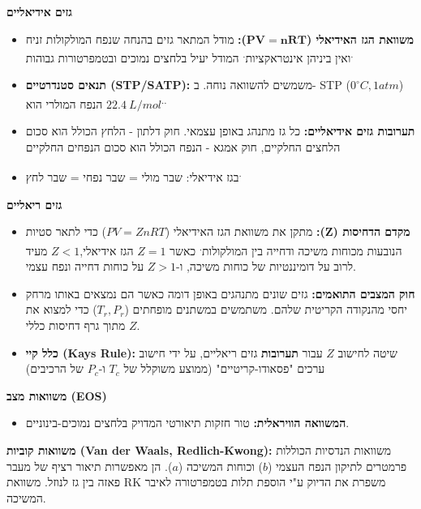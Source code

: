 \documentclass[
  hebrew,
  letterpaper,
  DIV=11,
  numbers=noendperiod]{scrreprt}
\providecommand{\tightlist}{%
  \setlength{\itemsep}{0pt}\setlength{\parskip}{0pt}}
\begin{document}
\textbf{גזים אידיאליים}

\begin{itemize}
\item
  \textbf{משוואת הגז האידיאלי (}\(\mathbf{PV = nRT}\)\textbf{):} מודל
  המתאר גזים בהנחה שנפח המולקולות זניח ואין ביניהן
  אינטראקציות\textsuperscript{.} המודל יעיל בלחצים נמוכים ובטמפרטורות
  גבוהות\textsuperscript{.}
\item
  \textbf{תנאים סטנדרטיים (STP/SATP):} משמשים להשוואה נוחה. ב- STP
  (\(0^{\circ}C,1atm\)) הנפח המולרי הוא
  \(22.4\ L\text{/}mol\)\textsuperscript{..}
\item
  \textbf{תערובות גזים אידיאליים:} כל גז מתנהג באופן עצמאי. חוק דלתון -
  הלחץ הכולל הוא סכום הלחצים החלקיים, חוק אמגא - הנפח הכולל הוא סכום
  הנפחים החלקיים
\item
  בגז אידיאלי: שבר מולי = שבר נפחי = שבר לחץ\textsuperscript{.}
\end{itemize}

\textbf{גזים ריאליים}

\begin{itemize}
\item
  \textbf{מקדם הדחיסות (}\(\mathbf{Z}\)\textbf{):} מתקן את משוואת הגז
  האידיאלי (\(PV = ZnRT\)) כדי לתאר סטיות הנובעות מכוחות משיכה ודחייה
  בין המולקולות\textsuperscript{.} כאשר \(Z = 1\) הגז אידיאלי,\(Z < 1\)
  מעיד לרוב על דומיננטיות של כוחות משיכה, ו-\(Z > 1\) על כוחות דחייה
  ונפח עצמי.
\item
  \textbf{חוק המצבים התואמים:} גזים שונים מתנהגים באופן דומה כאשר הם
  נמצאים באותו מרחק יחסי מהנקודה הקריטית שלהם. משתמשים במשתנים מופחתים
  (\(T_{r},P_{r}\)) כדי למצוא את \(Z\) מתוך גרף דחיסות כללי.
\item
  \textbf{כלל קיי (Kay\textquotesingle s Rule):} שיטה לחישוב \(Z\) עבור
  \textbf{תערובות} גזים ריאליים, על ידי חישוב ערכים "פסאודו-קריטיים"
  (ממוצע משוקלל של \(T_{c}\) ו-\(P_{c}\) של הרכיבים)
\end{itemize}

\textbf{משוואות מצב (EOS)}

\begin{itemize}
\tightlist
\item
  \textbf{המשוואה הוויראלית:} טור חזקות תיאורטי המדויק בלחצים
  נמוכים-בינוניים.
\end{itemize}

\textbf{משוואות קוביות (Van der Waals, Redlich-Kwong):} משוואות הנדסיות
הכוללות פרמטרים לתיקון הנפח העצמי (\(b\)) וכוחות המשיכה (\(a\)). הן
מאפשרות תיאור רציף של מעבר פאזה בין גז לנוזל. משוואת RK משפרת את הדיוק
ע"י הוספת תלות בטמפרטורה לאיבר המשיכה.
\end{document}
